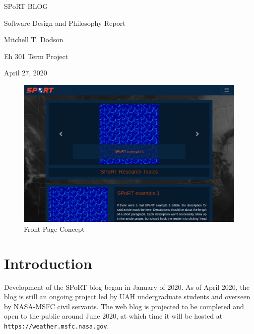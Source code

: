 \documentclass[12pt]{article}
\begin{document}
\thispagestyle{empty}
\vspace*{5em}
\begin{center}\Huge\sc
  SPoRT BLOG
\end{center}

\begin{center} \Huge
  Software Design and Philosophy Report
\end{center}

\vspace*{3em}
\begin{center} \Large
  Mitchell T. Dodson
\end{center}

\vfill

\begin{center} \Large
  Eh 301 Term Project

  April 27, 2020
\end{center}

\vspace*{3em}
\newpage

\tableofcontents
\newpage

\begin{figure}[h]
  \centering
  \includegraphics[width=.66\textwidth]{./figures/website-ss.png}
  \caption{Front Page Concept}
  \label{front page} %
\end{figure}

\section{Introduction}

Development of the SPoRT blog began in January of 2020. As of April 2020, the blog is still an ongoing project led by UAH undergraduate students and overseen by NASA-MSFC civil servants. The web blog is projected to be completed and open to the public around June 2020, at which time it will be hosted at \texttt{https://weather.msfc.nasa.gov}.
\end{document}
